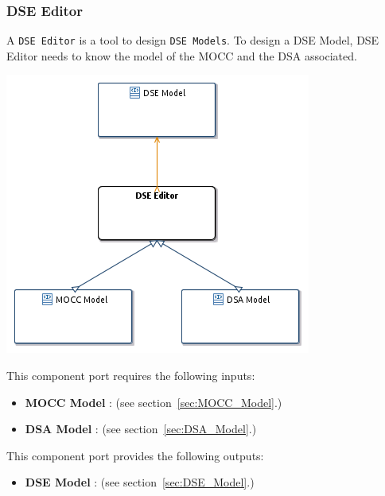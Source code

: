 \documentclass{gemoc} %
\begin{document}
\subsubsection{DSE Editor}
\label{sec:DSE_Editor}
A \texttt{DSE Editor} is a tool to design \texttt{DSE Models}.
\newline To design a DSE Model, DSE Editor needs to know the model of the MOCC and the DSA associated.
\begin{center}
\includegraphics*[trim=0.0cm 0.0cm 0cm 0.0cm, clip=true]{../images/generated/Generated_DSE_Editor.png}
\end{center}

This component port requires the following inputs:
\begin{itemize}
  \item \textbf{MOCC Model} :
(see section~\ref{sec:MOCC_Model}.)
  \item \textbf{DSA Model} :
(see section~\ref{sec:DSA_Model}.)
\end{itemize}

This component port provides the following outputs:
\begin{itemize}
  \item \textbf{DSE Model} :
(see section~\ref{sec:DSE_Model}.)
\end{itemize}
\end{document}
